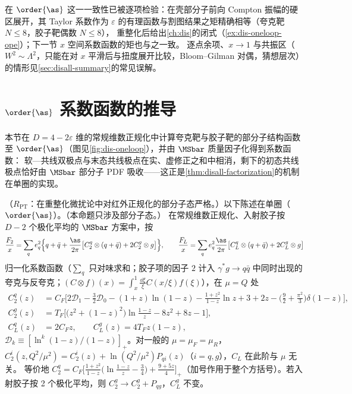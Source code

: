 \noindent
在 $\order{\as}$ 这一一致性已被逐项检验：在壳部分子前向 Compton 振幅的硬区展开，其 Taylor 系数作为 $\varepsilon$ 的有理函数与割图结果之矩精确相等（夸克靶 $N\le8$，胶子靶偶数 $N\le8$），
重整化后给出\cref{ch:dis}的闭式（\cref{ex:dis-oneloop-ope}）；下一节 $x$ 空间系数函数的矩也与之一致。   %
逐点余项、$x\to1$ 与共振区（$W^2\sim\Lambda^2$，只能在对 $x$ 平滑后与扭度展开比较，Bloom--Gilman 对偶，猜想层次）的情形见\cref{sec:disall-summary}的常见误解。

\section{$\order{\as}$ 系数函数的推导}\label{sec:disall-nlo}

本节在 $D=4-2\varepsilon$ 维的常规维数正规化中计算夸克靶与胶子靶的部分子结构函数至 $\order{\as}$（图见\cref{fig:dis-oneloop}），并由 $\MSbar$ 质量因子化得到系数函数：
软—共线双极点与末态共线极点在实、虚修正之和中相消，剩下的初态共线极点恰好由 $\MSbar$ 部分子 PDF 吸收——这正是\cref{thm:disall-factorization}的机制在单圈的实现。

\begin{proposition}\label{prop:disall-nlo}
（$R_{\mathrm{PT}}$：在重整化微扰论中对红外正规化的部分子态严格。）以下陈述在单圈（$\order{\as}$）。（本命题只涉及部分子态。）
在常规维数正规化、入射胶子按 $D-2$ 个极化平均的 $\MSbar$ 方案中，按
\begin{equation}\label{eq:disall-norm}
\frac{F_2}{x}=\sum_qe_q^2\Big\{q+\bar q+\frac{\as}{2\pi}\big[C_2^q\otimes(q+\bar q)+2C_2^g\otimes g\big]\Big\},\qquad
\frac{F_L}{x}=\sum_qe_q^2\frac{\as}{2\pi}\big[C_L^q\otimes(q+\bar q)+2C_L^g\otimes g\big]
\end{equation}
归一化系数函数（$\sum_q$ 只对味求和；胶子项的因子 $2$ 计入 $\gamma^*g\to q\bar q$ 中同时出现的夸克与反夸克；$(C\otimes f)(x)=\int_x^1\frac{\dd\xi}\xi C(x/\xi)f(\xi)$），在 $\mu=Q$ 处
\begin{equation}\label{eq:disall-C}
\begin{aligned}
C_2^q(z)&=C_F\Big[2\mathcal D_1-\frac32\mathcal D_0-(1+z)\ln(1-z)-\frac{1+z^2}{1-z}\ln z+3+2z-\Big(\frac92+\frac{\pi^2}3\Big)\delta(1-z)\Big],\\
C_2^g(z)&=T_F\Big[\big(z^2+(1-z)^2\big)\ln\frac{1-z}{z}-8z^2+8z-1\Big],\\
C_L^q(z)&=2C_Fz,\qquad C_L^g(z)=4T_Fz(1-z),
\end{aligned}   %
\end{equation}
$\mathcal D_k\equiv[\ln^k(1-z)/(1-z)]_+$。对一般的 $\mu=\mu_F=\mu_R$，$C_2^i(z,Q^2/\mu^2)=C_2^i(z)+\ln(Q^2/\mu^2)P_{qi}(z)$（$i=q,g$），$C_L$ 在此阶与 $\mu$ 无关。
等价地 $C_2^q=C_F\big[\frac{1+z^2}{1-z}\big(\ln\frac{1-z}z-\frac34\big)+\frac{9+5z}4\big]_+$（加号作用于整个方括号）。若入射胶子按 2 个极化平均，则 $C_2^g\to C_2^g+P_{qg}$，$C_L^g$ 不变。
\end{proposition}

